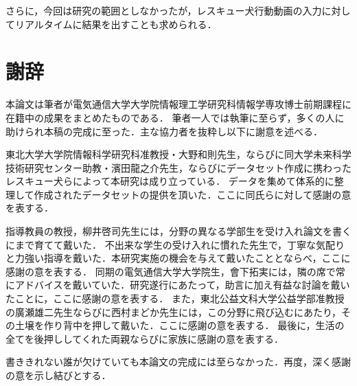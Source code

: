 さらに，今回は研究の範囲としなかったが，レスキュー犬行動動画の入力に対してリアルタイムに結果を出すことも求められる．

%


% 
% 

\chapter*{謝辞}
本論文は筆者が電気通信大学大学院情報理工学研究科情報学専攻博士前期課程に在籍中の成果をまとめたものである．
筆者一人では執筆に至らず，多くの人に助けられ本稿の完成に至った．主な協力者を抜粋し以下に謝意を述べる．


東北大学大学院情報科学研究科准教授・大野和則先生，ならびに同大学未来科学技術研究センター助教・濱田龍之介先生，ならびにデータセット作成に携わったレスキュー犬らによって本研究は成り立っている．
データを集めて体系的に整理して作成されたデータセットの提供を頂いた．ここに同氏らに対して感謝の意を表する．

指導教員の教授，柳井啓司先生には，分野の異なる学部生を受け入れ論文を書くにまで育てて戴いた．
不出来な学生の受け入れに慣れた先生で，丁寧な気配りと力強い指導を戴いた．本研究実施の機会を与えて戴いたこととならべ，ここに感謝の意を表する．
同期の電気通信大学大学院生，會下拓実には，隣の席で常にアドバイスを戴いていた．研究遂行にあたって，助言に加え有益な討論を戴いたことに，ここに感謝の意を表する．
また，東北公益文科大学公益学部准教授の廣瀬雄二先生ならびに西村まどか先生には，この分野に飛び込むにあたり，その土壌を作り背中を押して戴いた．ここに感謝の意を表する．
最後に，生活の全てを後押ししてくれた両親ならびに家族に感謝の意を表する．

書ききれない誰が欠けていても本論文の完成には至らなかった．再度，深く感謝の意を示し結びとする．



